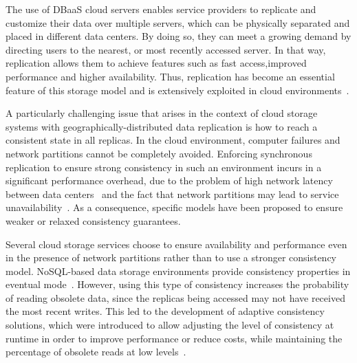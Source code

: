 %
%
The use of DBaaS cloud servers enables service providers to replicate
and customize their data over multiple servers, which can be physically separated and placed in different data centers.
By doing so, {\al they} can meet a growing demand by directing users to the nearest, or most recently accessed server. In that way, replication allows {\al them} to achieve features such as fast access,improved performance and higher availability. Thus, replication has become an essential feature of this storage model and is extensively exploited in cloud environments~\cite{Chang06bigtable:a, Ibrahim12}.

A particularly challenging issue that arises in the context of cloud storage systems with geo\-graphi\-cal\-ly-distributed data replication is how to reach a consistent state in all replicas. {\dg In the cloud environment, computer failures and network partitions cannot be completely avoided.} Enforcing synchronous replication to ensure strong consistency {\dg in such an environment} incurs in a significant performance overhead, due to the problem of high network latency between data centers~\cite{goel2007data} 
{\dg and the fact that network partitions may lead to service unavailability~\cite{Brewer2000}}. 
As a consequence, specific models have been proposed to ensure weaker or relaxed consistency guarantees.

Several cloud storage services choose to ensure availability and performance {\dg even in the presence of network partitions} rather than {\al to use} a stronger consistency model. NoSQL-based data storage environments provide consistency properties in  eventual mode~\cite{Vogels:2009}. However, using this type of consistency increases the probability of reading obsolete data, {\al since} the replicas being accessed may not have received the most recent writes. This led to the development of adaptive consistency solutions, which were introduced to allow adjusting the level of consistency at runtime in order to improve performance or reduce costs, while maintaining the percentage of obsolete reads at low levels~\cite{chihoub2012harmony, esteves2012quality, Terry:2013}.

